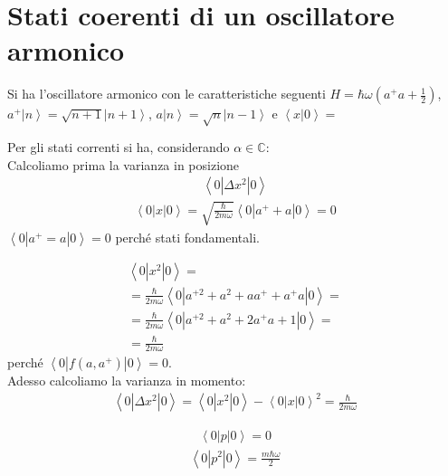 \section{Stati coerenti di un oscillatore armonico} %
Si ha l'oscillatore armonico con le caratteristiche seguenti $H=\hbar \omega \left(a^+a+\frac{1}{2}\right)$, $a^+\left |n \right\rangle=\sqrt{n+1}\left |n+1 \right\rangle$, $a\left |n \right\rangle=\sqrt{n}\left |n-1 \right\rangle$ e $\left\langle x|0 \right\rangle=$

Per gli stati correnti si ha, considerando $\alpha\in\mathbb{C} $:\\
Calcoliamo prima la varianza in posizione
\begin{equation}\begin{split}
\left\langle 0|\Delta x^2|0 \right\rangle
\end{split}\end{equation}
\begin{equation}\begin{split}
\left\langle 0|x|0 \right\rangle=\sqrt{\frac{\hbar }{2m\omega }}\left\langle 0|a^++a|0 \right\rangle=0
\end{split}\end{equation}
$\left\langle 0|a^+=a|0 \right\rangle=0$ perché stati fondamentali.

\begin{equation}\begin{split}
\left\langle 0|x^2|0 \right\rangle=\\
=\frac{\hbar }{2m\omega }\left\langle 0|a^{+2}+a^2+aa^++a^+a|0 \right\rangle=\\
=\frac{\hbar }{2m\omega }\left\langle 0|a^{+2}+a^2+2a^+a+1|0 \right\rangle=\\
=\frac{\hbar }{2m\omega }
\end{split}\end{equation}
perché $\left\langle 0|f(a,a^+)|0 \right\rangle=0$.\\
Adesso calcoliamo la varianza in momento:
\begin{equation}\begin{split}
\left\langle 0|\Delta x^2|0 \right\rangle=\left\langle 0|x^2|0 \right\rangle-\left\langle 0|x|0 \right\rangle^2=\frac{\hbar }{2m\omega }
\end{split}\end{equation}

\begin{equation}\begin{split}
\left\langle 0|p|0 \right\rangle=0
\end{split}\end{equation}
\begin{equation}\begin{split}
\left\langle 0|p^2|0 \right\rangle=\frac{m\hbar \omega }{2}
\end{split}\end{equation}

